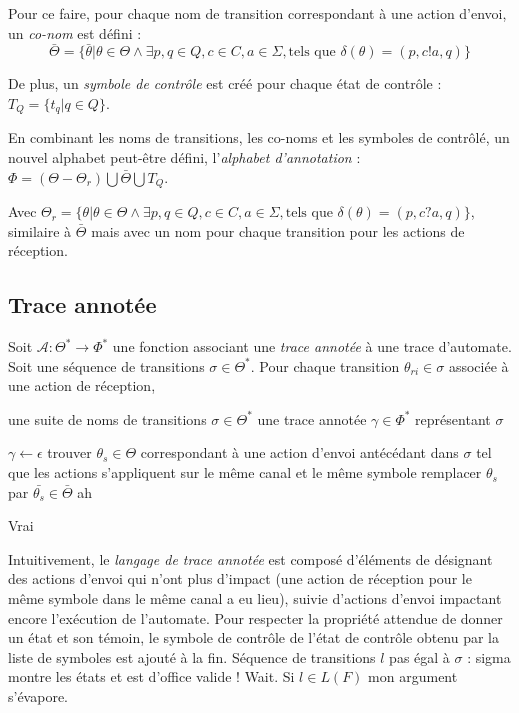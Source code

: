 Pour ce faire, pour chaque nom de transition correspondant à une action d'envoi, un \emph{co-nom} est défini :
$$
\bar{\Theta}=\{\bar{\theta}|\theta\in\Theta\wedge\exists p,q \in Q, c\in C, a\in\Sigma,\text{tels que } \delta(\theta)=(p,c!a,q)\}
$$

De plus, un \emph{symbole de contrôle} est créé pour chaque état de contrôle : $T_Q = \{t_q | q\in Q\}$.

En combinant les noms de transitions, les co-noms et les symboles de contrôlé, un nouvel alphabet peut-être défini, l'\emph{alphabet d'annotation} : $\Phi=(\Theta-\Theta_r)\bigcup\bar{\Theta}\bigcup T_Q$.

Avec $\Theta_r=\{\theta|\theta\in\Theta\wedge\exists p,q \in Q, c\in C, a\in\Sigma,\text{tels que } \delta(\theta)=(p,c?a,q)\}$, similaire à $\bar{\Theta}$ mais avec un nom pour chaque transition pour les actions de réception.


\subsection{Trace annotée}


Soit $\mathcal{A}:\Theta^*\rightarrow\Phi^*$ une fonction associant une \emph{trace annotée} à une trace d'automate. Soit une séquence de transitions $\sigma\in\Theta^*$. Pour chaque transition $\theta_{ri}\in\sigma$ associée à une action de réception,


\begin{algorithm}[H]
  	\begin{algorithmic}[1]
    \REQUIRE une suite de noms de transitions $\sigma\in\Theta^*$
		\ENSURE une trace annotée $\gamma\in\Phi^*$ représentant $\sigma$

    \STATE $\gamma\leftarrow\epsilon$
        \STATE trouver $\theta_s\in\Theta$ correspondant à une action d'envoi antécédant dans $\sigma$ tel que les actions s'appliquent sur le même canal et le même symbole
        \STATE remplacer $\theta_s$ par $\bar{\theta_s}\in\bar{\Theta}$
        \STATE ah
      \ENDIF
    \ENDFOR

		\RETURN Vrai
	\end{algorithmic}
	\caption{$\mathcal{A}:\Theta^*\rightarrow\Phi^*$}\label{alg:A}
\end{algorithm}








Intuitivement, le \emph{langage de trace annotée} est composé d'éléments de \barTheta désignant des actions d'envoi qui n'ont plus d'impact (une action de réception pour le même symbole dans le même canal a eu lieu), suivie d'actions d'envoi impactant encore l'exécution de l'automate. Pour respecter la propriété attendue de donner un état et son témoin, le symbole de contrôle de l'état de contrôle obtenu par la liste de symboles est ajouté à la fin.
Séquence de transitions $l$ pas égal à $\sigma$ : sigma montre les états et est d'office valide !
Wait. Si $l\in L(F)$ mon argument s'évapore.
